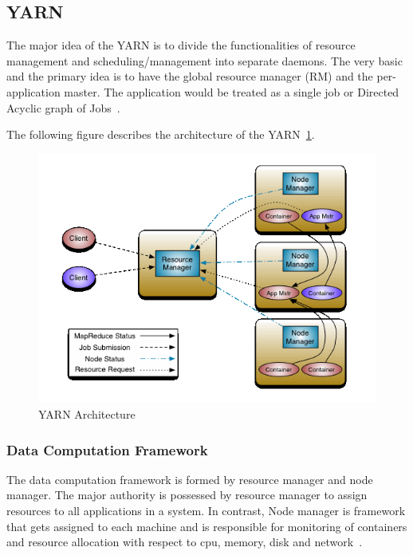 \subsection{YARN}
The major idea of the YARN is to divide the functionalities of
resource management and scheduling/management into 
separate daemons. The very basic and the primary idea 
is to have the global resource manager (RM) and the per-application master. 
The application would be treated as a single job 
or Directed Acyclic 
graph of Jobs~\cite{hid-sp18-412-YARN_Architecture}.

The following figure describes the architecture 
of the YARN~\ref{s:archiyarn}.

\begin{figure}[!ht]
\centering\includegraphics[width=\textwidth]{images/YARNArchitecture.png}
\caption{YARN 
Architecture~\cite{hid-sp18-412-YARN_Architecture}}\label{s:archiyarn}
\end{figure}

\subsubsection{Data Computation Framework}
The data computation framework is formed by resource manager 
and node manager. The major authority is possessed  
by resource manager to assign resources to all 
applications in a system. In contrast, 
Node manager is framework that gets assigned 
to each machine and is responsible for monitoring of 
containers and resource allocation with 
respect to cpu, memory, disk 
and network~\cite{hid-sp18-412-YARN_Architecture}.


